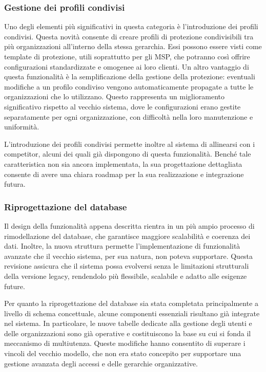 \subsubsection{Gestione dei profili condivisi}
Uno degli elementi più significativi in questa categoria è l’introduzione dei profili condivisi. Questa novità consente di creare profili di protezione condivisibili tra più organizzazioni all'interno della stessa gerarchia. Essi possono essere visti come template di protezione, utili soprattutto per gli MSP, che potranno così offrire configurazioni standardizzate e omogenee ai loro clienti. Un altro vantaggio di questa funzionalità è la semplificazione della gestione della protezione: eventuali modifiche a un profilo condiviso vengono automaticamente propagate a tutte le organizzazioni che lo utilizzano. Questo rappresenta un miglioramento significativo rispetto al vecchio sistema, dove le configurazioni erano gestite separatamente per ogni organizzazione, con difficoltà nella loro manutenzione e uniformità.

L’introduzione dei profili condivisi permette inoltre al sistema di allinearsi con i competitor, alcuni dei quali già dispongono di questa funzionalità. Benché tale caratteristica non sia ancora implementata, la sua progettazione dettagliata consente di avere una chiara roadmap per la sua realizzazione e integrazione futura.

\subsubsection{Riprogettazione del database}
Il design della funzionalità appena descritta rientra in un più ampio processo di rimodellazione del database, che garantisce maggiore scalabilità e coerenza dei dati. Inoltre, la nuova struttura permette l’implementazione di funzionalità avanzate che il vecchio sistema, per sua natura, non poteva supportare. Questa revisione assicura che il sistema possa evolversi senza le limitazioni strutturali della versione legacy, rendendolo più flessibile, scalabile e adatto alle esigenze future.

Per quanto la riprogettazione del database sia stata completata principalmente a livello di schema concettuale, alcune componenti essenziali risultano già integrate nel sistema. In particolare, le nuove tabelle dedicate alla gestione degli utenti e delle organizzazioni sono già operative e costituiscono la base su cui si fonda il meccanismo di multiutenza. Queste modifiche hanno consentito di superare i vincoli del vecchio modello, che non era stato concepito per supportare una gestione avanzata degli accessi e delle gerarchie organizzative.

